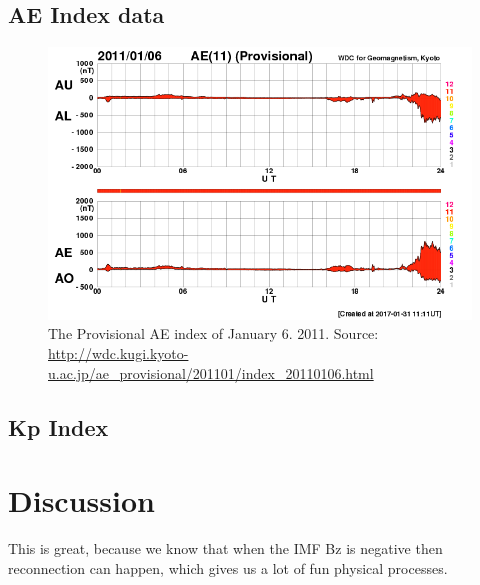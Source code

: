 \documentclass[norsk,a4paper,11pt]{article}
\begin{document}
\begin{multicols}{2}

\subsection{AE Index data} %
\label{sub:AE_index_data}

\begin{figure}[H]
	\includegraphics[scale=0.4]{Figures/pvae_2011_01_06.png}
	\centering
	\caption{The Provisional AE index of January 6. 2011. Source: \url{http://wdc.kugi.kyoto-u.ac.jp/ae_provisional/201101/index_20110106.html}}
	\label{fig:AE}
\end{figure}


\subsection{Kp Index} %
\label{sub:kp_index}

 


\section{Discussion} %
\label{sec:discussion}



This is great, because we know that when the IMF Bz is negative then reconnection can happen, which gives us a lot of fun physical processes.
\\












\end{multicols}
\end{document}
